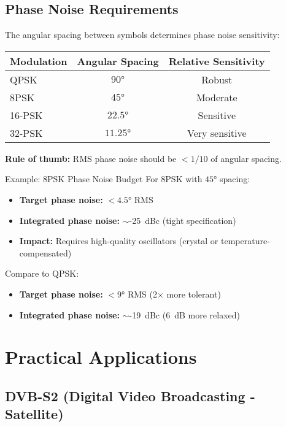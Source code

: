\subsection{Phase Noise Requirements}

The angular spacing between symbols determines phase noise sensitivity:

\begin{center}
\begin{tabular}{@{}lcc@{}}
\toprule
Modulation & Angular Spacing & Relative Sensitivity \\
\midrule
QPSK & $90°$ & Robust \\
8PSK & $45°$ & Moderate \\
16-PSK & $22.5°$ & Sensitive \\
32-PSK & $11.25°$ & Very sensitive \\
\bottomrule
\end{tabular}
\end{center}

\textbf{Rule of thumb:} RMS phase noise should be $< 1/10$ of angular spacing.

\begin{calloutbox}{Example: 8PSK Phase Noise Budget}
For 8PSK with $45°$ spacing:
\begin{itemize}
\item \textbf{Target phase noise:} $< 4.5°$ RMS
\item \textbf{Integrated phase noise:} $\sim$-25~dBc (tight specification)
\item \textbf{Impact:} Requires high-quality oscillators (crystal or temperature-compensated)
\end{itemize}

Compare to QPSK:
\begin{itemize}
\item \textbf{Target phase noise:} $< 9°$ RMS (2$\times$ more tolerant)
\item \textbf{Integrated phase noise:} $\sim$-19~dBc (6~dB more relaxed)
\end{itemize}
\end{calloutbox}

\section{Practical Applications}

\subsection{DVB-S2 (Digital Video Broadcasting - Satellite)}


